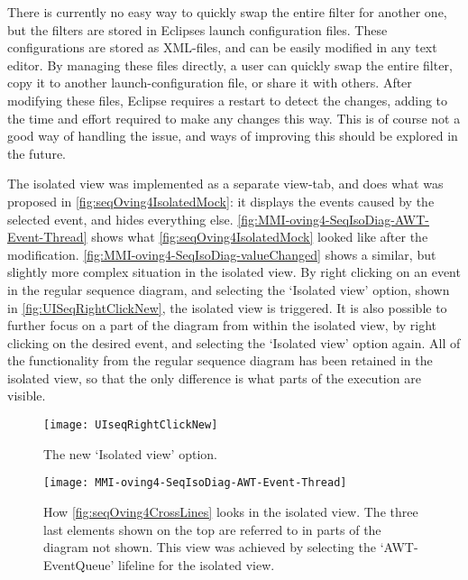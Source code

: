 There is currently no easy way to quickly swap the entire filter for another one, but the filters are stored in Eclipses launch configuration files.
These configurations are stored as XML-files, and can be easily modified in any text editor.
By managing these files directly, a user can quickly swap the entire filter, copy it to another launch-configuration file, or share it with others.
After modifying these files, Eclipse requires a restart to detect the changes, adding to the time and effort required to make any changes this way.
This is of course not a good way of handling the issue, and ways of improving this should be explored in the future.

The isolated view was implemented as a separate view-tab, and does what was proposed in \autoref{fig:seqOving4IsolatedMock}: it displays the events caused by the selected event, and hides everything else.
\autoref{fig:MMI-oving4-SeqIsoDiag-AWT-Event-Thread} shows what \autoref{fig:seqOving4IsolatedMock} looked like after the modification.
\autoref{fig:MMI-oving4-SeqIsoDiag-valueChanged} shows a similar, but slightly more complex situation in the isolated view.
By right clicking on an event in the regular sequence diagram, and selecting the `Isolated view' option, shown in \autoref{fig:UISeqRightClickNew}, the isolated view is triggered.
It is also possible to further focus on a part of the diagram from within the isolated view, by right clicking on the desired event, and selecting the `Isolated view' option again.
All of the functionality from the regular sequence diagram has been retained in the isolated view, so that the only difference is what parts of the execution are visible.
\begin{figure}[H]
	\centering
	\texttt{[image: UIseqRightClickNew]}
	\caption{The new `Isolated view' option.}
	\label{fig:UISeqRightClickNew}
\end{figure}

\begin{figure}[H]
	\centering
	\texttt{[image: MMI-oving4-SeqIsoDiag-AWT-Event-Thread]}
	\caption[How \autoref{fig:seqOving4CrossLines} looks in the isolated view.]{How \autoref{fig:seqOving4CrossLines} looks in the isolated view. The three last elements shown on the top are referred to in parts of the diagram not shown. This view was achieved by selecting the `AWT-EventQueue' lifeline for the isolated view.}
	\label{fig:MMI-oving4-SeqIsoDiag-AWT-Event-Thread}
\end{figure}

